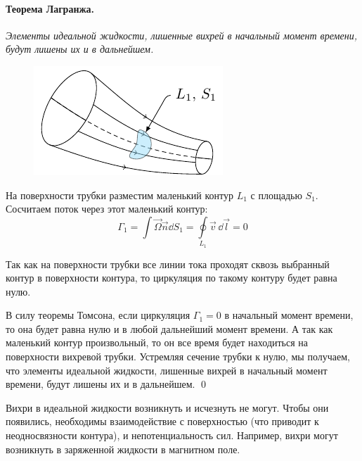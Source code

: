 \paragraph{Теорема Лагранжа. } \textit{Элементы идеальной жидкости, лишенные вихрей в начальный момент
	времени, будут лишены их и в дальнейшем.}



\begin{figure}[h!]
    \centering
    \includegraphics[scale=1.5]{img/toms2}
    \caption{}
    \label{fig:figure1}
\end{figure}

На поверхности трубки разместим маленький контур $L_1$ с площадью $S_1$. Сосчитаем поток через этот маленький контур:
\begin{equation}
	\Gamma_1=\int \vec\Omega \vec{n}\dd S_1 = \oint\limits_{L_1} \vec{v} \,\dd\vec{l} = 0
\end{equation}

Так как на поверхности трубки все линии тока проходят сквозь выбранный контур в поверхности контура, то циркуляция по такому контуру будет равна нулю. 

В силу теоремы Томсона, если циркуляция $\Gamma_1=0$ в начальный момент времени, то она будет равна нулю и в любой дальнейший момент времени. А так как маленький контур произвольный, то он все время будет находиться на поверхности вихревой трубки. Устремляя сечение трубки к нулю, мы получаем, что элементы идеальной жидкости, лишенные вихрей в начальный момент времени, будут лишены их и в дальнейшем.
\qed

Вихри в идеальной жидкости возникнуть и исчезнуть не могут. Чтобы они появились, необходимы взаимодействие с поверхностью (что приводит к неодносвязности контура), и непотенциальность сил. Например, вихри могут возникнуть в заряженной жидкости в магнитном поле.

